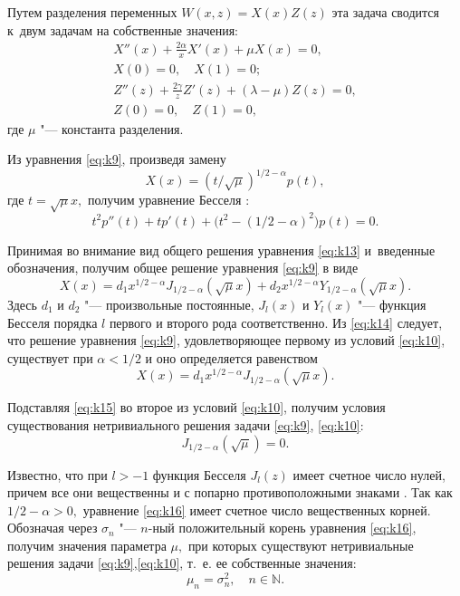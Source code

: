 		Путем разделения переменных $W(x,z)=X(x)Z(z)$ эта задача сводится к~двум задачам на собственные значения:
\begin{gather}
X''(x)+\frac{2\alpha}{x}X'(x)+\mu X(x)=0,
\label{eq:k9}
\\
X(0)=0, \quad X(1)=0;
\label{eq:k10}
\\
Z''(z)+\frac{2\gamma}{z}Z'(z)+(\lambda-\mu)Z(z)=0,
\label{eq:k11}
\\
Z(0)=0, \quad Z(1)=0,
\label{eq:k12}
\end{gather}
где $\mu$ "---  константа разделения.

Из уравнения \eqref{eq:k9}, произведя замену 
$$X(x)=(t/\sqrt\mu)^{1/2-\alpha}p(t),$$ где $t=\sqrt\mu x,$ получим уравнение Бесселя \cite[\S~3.1]{uk:bib:Vatson}:
\begin{equation}
t^2 p''(t)+tp'(t)+\bigl(t^2-(1/2 -\alpha)^2\bigr)p(t)= 0.
\label{eq:k13}
\end{equation}

Принимая во внимание вид общего решения \cite[\S~3.1]{uk:bib:Vatson} уравнения \eqref{eq:k13} и~введенные обозначения, получим общее решение уравнения \eqref{eq:k9} в виде
\begin{equation}
X(x)=d_1 x^{1/2-\alpha} J_{1/2-\alpha}(\sqrt\mu x)+d_2 x^{1/2-\alpha}Y_{1/2-\alpha}(\sqrt \mu x).
\label{eq:k14}
\end{equation}
Здесь $d_1 $ и $d_2$ "--- произвольные постоянные, $J_l(x)$ и $Y_l(x)$ "--- функция Бесселя порядка $l$ первого и второго рода \cite[\S\S~3.1, 3.5]{uk:bib:Vatson} соответственно. 
Из \eqref{eq:k14} следует, что решение уравнения \eqref{eq:k9}, удовлетворяющее первому из условий \eqref{eq:k10}, существует при $\alpha<1/2$ и оно определяется равенством
\begin{equation}
X(x)=d_1 x^{1/2-\alpha}J_{1/2-\alpha}(\sqrt\mu x).
\label{eq:k15}
\end{equation}

Подставляя \eqref{eq:k15} во второе из условий \eqref{eq:k10}, получим условия существования нетривиального решения задачи \eqref{eq:k9}, \eqref{eq:k10}:
\begin{equation}
J_{ 1/2 -\alpha}(\sqrt\mu)=0.
\label{eq:k16}
\end{equation}

Известно, что при $l>-1$ функция Бесселя $J_l(z)$ имеет счетное число нулей, причем все они вещественны и с попарно противоположными знаками \cite[\S~15.23]{uk:bib:Vatson}. 
Так как $ 1/2 -\alpha>0,$ уравнение \eqref{eq:k16} имеет счетное число вещественных корней. 
Обозначая через $\sigma_n$ "--- $n$-ный положительный корень уравнения \eqref{eq:k16}, получим значения параметра $\mu,$ при которых существуют нетривиальные решения задачи \eqref{eq:k9},\eqref{eq:k10}, т.~е. ее собственные значения: 
$$\mu_n=\sigma_n ^2,\quad n \in \mathbb N.$$

